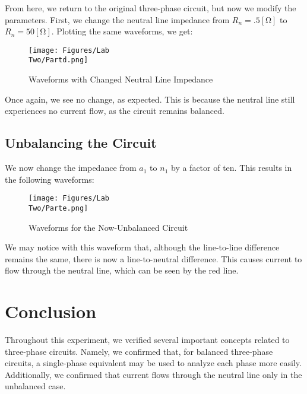 \documentclass[
	letterpaper, %
	10pt, %
]{CSUniSchoolLabReport}
\begin{document}
From here, we return to the original three-phase circuit, but now we modify the parameters. First, we change the neutral line impedance from $R_n=.5[\si{\ohm}]$ to $R_n=50[\si{\ohm}]$. Plotting the same waveforms, we get:

\begin{figure}[H]
  \centering
  \texttt{[image: Figures/Lab\\ Two/Partd.png]}
  \caption{Waveforms with Changed Neutral Line Impedance}
  \label{fig:5}
\end{figure}

Once again, we see no change, as expected. This is because the neutral line still experiences no current flow, as the circuit remains balanced.

\subsection{Unbalancing the Circuit}

We now change the impedance from $a_1$ to $n_1$ by a factor of ten. This results in the following waveforms:

\begin{figure}[H]
  \centering
  \texttt{[image: Figures/Lab\\ Two/Parte.png]}
  \caption{Waveforms for the Now-Unbalanced Circuit}
  \label{fig:6}
\end{figure}

We may notice with this waveform that, although the line-to-line difference remains the same, there is now a line-to-neutral difference. This causes current to flow through the neutral line, which can be seen by the red line.

\section{Conclusion}

Throughout this experiment, we verified several important concepts related to three-phase circuits. Namely, we confirmed that, for balanced three-phase circuits, a single-phase equivalent may be used to analyze each phase more easily. Additionally, we confirmed that current flows through the neutral line only in the unbalanced case.
\end{document}
